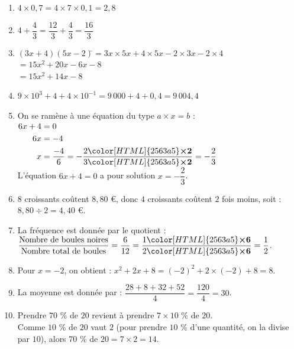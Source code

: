 \documentclass[a4paper,11pt,eval]{nsi} %
\begin{document}
\textcolor{UGLiBlue}{
    \begin{enumerate}[itemsep=1em]
        \item $4 \times 0{,}7=4\times 7\times 0,1=2{,}8$
        \item $4+\dfrac{4}{3}= \dfrac{12}{3}+\dfrac{4}{3}=\dfrac{16}{3}$
        \item \begin{tabbing}
            $(3x+4)(5x-2)$\=$=3x\times 5x+4\times 5x-2\times 3x-2\times 4$\\
            \>$=15x^2+20x-6x-8$\\
            \>$=15x^2+14x-8$
        \end{tabbing}
        \item $9\times10^3+4+4\times 10^{-1}=9\,000+4+0{,}4=9\,004{,}4$
        \item On se ramène à une équation du type $a\times x=b$ :\\
                  $\begin{aligned}
                  6x+4&=0\\
                 6x&=-4\\
                                      x&=\dfrac{-4}{6}=-\dfrac{2{\color[HTML]{2563a5}\boldsymbol{\times2}} }{3{\color[HTML]{2563a5}\boldsymbol{\times2}}}=-\dfrac{2}{3}
                 \end{aligned}$\\
                  L'équation $6x+4=0$ a pour solution $x=-\dfrac{2}{3}$.
        \item $8$ croissants coûtent  $8{,}80$ €, donc
                               $4$ croissants coûtent $2$ fois moins, soit : \\
                               $8{,}80\div 2=4{,}40$ €.
        \item La fréquence est donnée par le quotient : $\dfrac{\text{Nombre de boules noires}}{\text{Nombre total de boules}}=\dfrac{6}{12}=\dfrac{1{\color[HTML]{2563a5}\boldsymbol{\times6}} }{2{\color[HTML]{2563a5}\boldsymbol{\times6}}}=\dfrac{1}{2}$.
        \item 
                    Pour $x=-2$, on obtient : $x^2+2x+8=(-2)^2+2\times (-2)+8=8$.        
        \item La moyenne est donnée par : $\dfrac{28+8+32+52}{4}=\dfrac{120}{4}=30$.
        \item           Prendre $70$ $\%$  de $20$ revient à prendre $7\times 10$ $\%$  de $20$.\\
                    Comme $10$ $\%$  de $20$ vaut $2$ (pour prendre $10$ $\%$  d'une quantité, on la divise par $10$), alors
                    $70$ $\%$ de $20=7\times 2=14$.
\end{enumerate}
}
\end{document}
